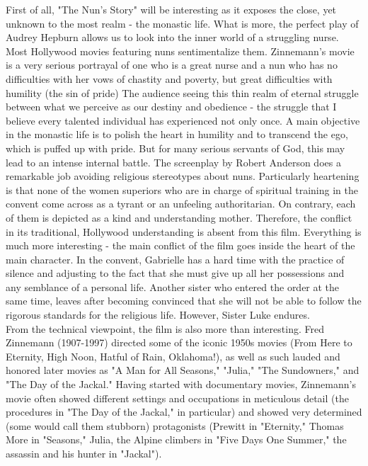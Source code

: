 \documentclass[8pt]{article} %
\begin{document}
First of all, "The Nun's Story" will be interesting as it exposes the close, yet unknown to the most realm - the monastic life. What is more, the perfect play of Audrey Hepburn allows us to look into the inner world of a struggling
nurse. Most Hollywood movies featuring nuns sentimentalize them. Zinnemann's movie is a very serious portrayal of one who is a great nurse and a nun who has no difficulties with her vows of chastity and poverty, but great difficulties with humility (the sin of pride)
The audience seeing this thin realm of eternal struggle between what we perceive as our destiny and obedience - the struggle that I believe every talented individual has experienced not only once. A main objective in the monastic life is to polish the heart in humility and to transcend the ego, which is puffed up with pride. But for many serious servants of God, this may lead to an intense internal battle. The screenplay by Robert Anderson does a remarkable job avoiding religious stereotypes about nuns. Particularly heartening is that none of the women superiors who are in charge of spiritual training in the convent come across as a tyrant or an unfeeling authoritarian. On contrary, each of them is depicted as a
kind and understanding mother. Therefore, the conflict in its traditional, Hollywood understanding is absent from this film. Everything is much more interesting - the main conflict of the film goes inside the heart of the main 
character. In the convent, Gabrielle has a hard time with the practice of silence and adjusting to the fact that she must give up all her possessions and any semblance of a personal life. Another sister who entered the order at the same time, leaves after becoming convinced that she will not be able to follow the rigorous standards for the religious life. However, Sister Luke endures. \\
From the technical viewpoint, the film is also more than interesting. 
Fred Zinnemann (1907-1997) directed some of the iconic 1950s movies (From Here to Eternity, High Noon, Hatful of Rain, Oklahoma!), as well as such lauded and honored later movies as "A Man for All Seasons," "Julia," "The Sundowners," and "The Day of the Jackal." Having started with documentary movies, Zinnemann's movie often showed different settings and occupations in meticulous detail (the procedures in "The Day of the Jackal," in particular) and showed very determined (some would call them stubborn) protagonists (Prewitt in "Eternity," Thomas More in "Seasons," Julia, the Alpine climbers in "Five Days One Summer," the assassin and his hunter in "Jackal"). 
\end{document}
